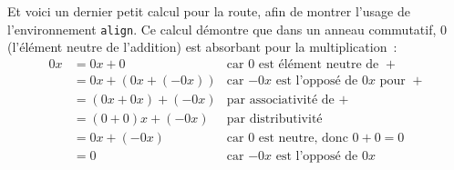 \documentclass{article}
\begin{document}
Et voici un dernier petit calcul pour la route, afin de montrer l'usage de
l'environnement \texttt{align}. %
Ce calcul démontre que dans un anneau commutatif, $0$ (l'élément neutre de
l'addition) est absorbant pour la multiplication~:
\begin{align*}
  0x  &= 0x + 0            & \text{car $0$ est élément neutre de $+$}\\
      &= 0x + (0x + (-0x)) & \text{car $-0x$ est l'opposé de $0x$ pour $+$}\\
      &= (0x + 0x) + (-0x) & \text{par associativité de $+$}\\
      &= (0 + 0)x + (-0x)  & \text{par distributivité}\\
      &= 0x + (-0x)        & \text{car $0$ est neutre, donc $0+0=0$}\\
      &= 0                 & \text{car $-0x$ est l'opposé de $0x$}
\end{align*}
\end{document}
